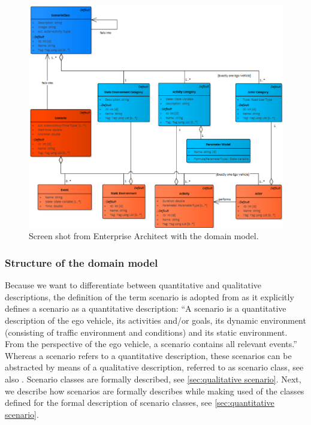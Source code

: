 \documentclass[10pt,final,a4paper,oneside,onecolumn]{article}
\theoremstyle{plain}\newtheorem{definition}{Definition}[section]    %
\theoremstyle{definition}\newtheorem{example}{Example}[section]     %
\theoremstyle{remark}\newtheorem{remarkenv}{Remark}[section]        %
\begin{document}
\begin{figure}
	\centering
	\includegraphics[width=\linewidth]{domain_model}
	\caption{Screen shot from Enterprise Architect with the domain model.}
	\label{fig:domain model}
\end{figure}

\subsubsection{Structure of the domain model}
\label{sec:structure domain model}

Because we want to differentiate between quantitative and qualitative descriptions, the definition of the term scenario is adopted from \cite{elrofai2018scenario} as it explicitly defines a scenario as a quantitative description: ``A scenario is a quantitative description of the ego vehicle, its activities and/or goals, its dynamic environment (consisting of traffic environment and conditions) and its static environment. From the perspective of the ego vehicle, a scenario contains all relevant events.'' Whereas a scenario refers to a quantitative description, these scenarios can be abstracted by means of a qualitative description, referred to as scenario class, see also \cite{ploeg2018cetran, elrofai2018scenario}. Scenario classes are formally described, see \cref{sec:qualitative scenario}. Next, we describe how scenarios are formally describes while making used of the classes defined for the formal description of scenario classes, see \cref{sec:quantitative scenario}.
\end{document}

